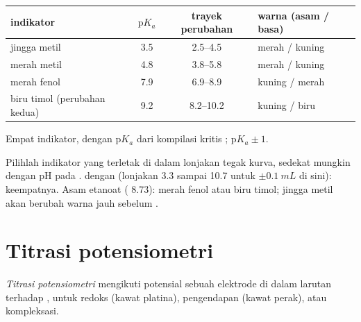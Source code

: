 \begin{omfigure}
\begin{tabular}{lccl}
\hline
indikator & $\mathrm{p}K_a$ & trayek perubahan & warna (asam / basa) \\
\hline
jingga metil & 3.5 & 2.5--4.5 & merah / kuning \\
merah metil & 4.8 & 3.8--5.8 & merah / kuning \\
merah fenol & 7.9 & 6.9--8.9 & kuning / merah \\
biru timol (perubahan kedua) & 9.2 & 8.2--10.2 & kuning / biru \\
\hline
\end{tabular}

\smallskip
{\small Empat indikator, dengan $\mathrm{p}K_a$ dari kompilasi kritis
;  $\mathrm{p}K_a \pm 1$.}
\end{omfigure}

\begin{method}\label{met:b1:titration-methods:choose-indicator}
Pilihlah indikator yang  terletak di dalam
lonjakan tegak kurva, sedekat mungkin dengan pH pada .  dengan  (lonjakan 3.3 sampai 10.7 untuk
$\pm\qty{0.1}{mL}$ di sini): keempatnya. Asam etanoat ( 8.73):
merah fenol atau biru timol; jingga metil akan berubah warna jauh
sebelum .
\end{method}

\section{Titrasi potensiometri}

\begin{definition}\label{def:b1:titration-methods:potentiometric}
\emph{Titrasi potensiometri} mengikuti
potensial sebuah elektrode di dalam larutan terhadap ,
untuk  redoks (kawat platina), pengendapan (kawat perak), atau
kompleksasi.
\end{definition}

